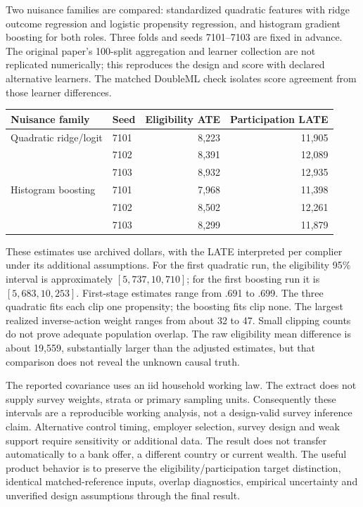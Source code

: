 Two nuisance families are compared: standardized quadratic features with
ridge outcome regression and logistic propensity regression, and histogram
gradient boosting for both roles. Three folds and seeds 7101--7103 are fixed
in advance. The original paper's 100-split aggregation and learner collection
are not replicated numerically; this reproduces the design and score with
declared alternative learners. The matched DoubleML check isolates score
agreement from those learner differences.

\begin{center}\small
\begin{tabular}{llrr}\toprule
Nuisance family&Seed&Eligibility ATE&Participation LATE\\\midrule
Quadratic ridge/logit&7101&8,223&11,905\\
&7102&8,391&12,089\\
&7103&8,932&12,935\\
Histogram boosting&7101&7,968&11,398\\
&7102&8,502&12,261\\
&7103&8,299&11,879\\\bottomrule
\end{tabular}\end{center}
These estimates use archived dollars, with the LATE interpreted per
complier under its additional assumptions. For the first quadratic run,
the eligibility 95\% interval is approximately $[5,737,10,710]$; for the
first boosting run it is $[5,683,10,253]$. First-stage estimates range from
.691 to .699. The three quadratic fits each clip one propensity; the
boosting fits clip none. The largest realized inverse-action weight ranges
from about 32 to 47. Small clipping counts do not prove adequate population
overlap. The raw eligibility mean difference is about 19,559, substantially
larger than the adjusted estimates, but that comparison does not reveal the
unknown causal truth.

The reported covariance uses an iid household working law. The extract does
not supply survey weights, strata or primary sampling units. Consequently
these intervals are a reproducible working analysis, not a design-valid
survey inference claim. Alternative control timing, employer selection,
survey design and weak support require sensitivity or additional data.
The result does not transfer automatically to a bank offer, a different
country or current wealth. The useful product behavior is to preserve the
eligibility/participation target distinction, identical matched-reference
inputs, overlap diagnostics, empirical uncertainty and unverified design
assumptions through the final result.


